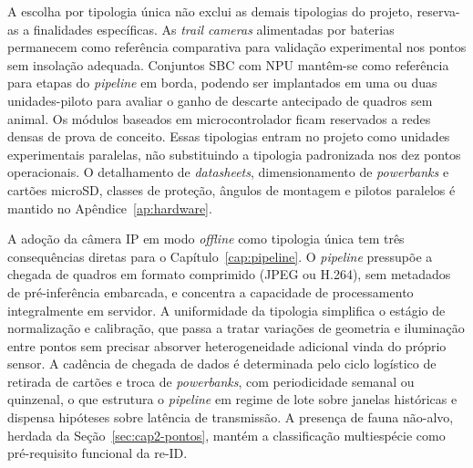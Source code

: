 A escolha por tipologia única não exclui as demais tipologias do projeto, reserva-as a finalidades específicas. As \textit{trail cameras} alimentadas por baterias permanecem como referência comparativa para validação experimental nos pontos sem insolação adequada. Conjuntos SBC com NPU mantêm-se como referência para etapas do \textit{pipeline} em borda, podendo ser implantados em uma ou duas unidades-piloto para avaliar o ganho de descarte antecipado de quadros sem animal. Os módulos baseados em microcontrolador ficam reservados a redes densas de prova de conceito. Essas tipologias entram no projeto como unidades experimentais paralelas, não substituindo a tipologia padronizada nos dez pontos operacionais. O detalhamento de \textit{datasheets}, dimensionamento de \textit{powerbanks} e cartões microSD, classes de proteção, ângulos de montagem e pilotos paralelos é mantido no Apêndice~\ref{ap:hardware}.


A adoção da câmera IP em modo \textit{offline} como tipologia única tem três consequências diretas para o Capítulo~\ref{cap:pipeline}. O \textit{pipeline} pressupõe a chegada de quadros em formato comprimido (JPEG ou H.264), sem metadados de pré-inferência embarcada, e concentra a capacidade de processamento integralmente em servidor. A uniformidade da tipologia simplifica o estágio de normalização e calibração, que passa a tratar variações de geometria e iluminação entre pontos sem precisar absorver heterogeneidade adicional vinda do próprio sensor. A cadência de chegada de dados é determinada pelo ciclo logístico de retirada de cartões e troca de \textit{powerbanks}, com periodicidade semanal ou quinzenal, o que estrutura o \textit{pipeline} em regime de lote sobre janelas históricas e dispensa hipóteses sobre latência de transmissão. A presença de fauna não-alvo, herdada da Seção~\ref{sec:cap2-pontos}, mantém a classificação multiespécie como pré-requisito funcional da re-ID.
